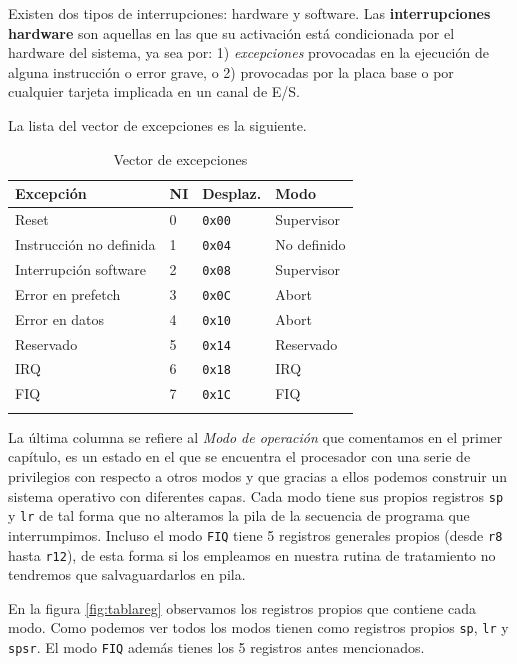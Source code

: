 Existen dos tipos de interrupciones: hardware y software. Las {\bf
interrupciones hardware} son aquellas en las que su activación está
condicionada por el hardware del sistema, ya sea por: 1) {\it
excepciones} provocadas en la ejecución de alguna instrucción o error
grave, o 2) provocadas por la placa base o por cualquier tarjeta
implicada en un canal de E/S.

\noindent La lista del vector de excepciones es la siguiente.

\begin{longtable}{ p{5cm} | p{1cm} | p{2cm} | p{4cm}}
\hline
{\bf Excepción} & {\bf NI} & {\bf Desplaz.} & {\bf Modo} \\ \hline
Reset                   & 0 & {\tt 0x00} & Supervisor \\ \hline
Instrucción no definida & 1 & {\tt 0x04} & No definido \\ \hline
Interrupción software   & 2 & {\tt 0x08} & Supervisor \\ \hline
Error en prefetch       & 3 & {\tt 0x0C} & Abort \\ \hline
Error en datos          & 4 & {\tt 0x10} & Abort \\ \hline
Reservado               & 5 & {\tt 0x14} & Reservado \\ \hline
IRQ                     & 6 & {\tt 0x18} & IRQ \\ \hline
FIQ                     & 7 & {\tt 0x1C} & FIQ \\ \hline
\caption{Vector de excepciones}
\label{tab:excepciones}
\end{longtable}

La última columna se refiere al {\it Modo de operación} que comentamos en el primer
capítulo, es un estado en el que se encuentra el procesador con una serie de privilegios
con respecto a otros modos y que gracias a ellos podemos construir un sistema operativo
con diferentes capas. Cada modo tiene sus propios registros {\tt sp} y {\tt lr} de tal
forma que no alteramos la pila de la secuencia de programa que interrumpimos. Incluso
el modo {\tt FIQ} tiene 5 registros generales propios (desde {\tt r8} hasta {\tt r12}),
de esta forma si los empleamos en nuestra rutina de tratamiento no tendremos que
salvaguardarlos en pila.

En la figura \ref{fig:tablareg} observamos los registros propios que contiene cada modo.
Como podemos ver todos los modos tienen como registros propios {\tt sp}, {\tt lr} y {\tt spsr}.
El modo {\tt FIQ} además tienes los 5 registros antes mencionados.

